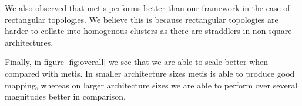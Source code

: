 We also observed that metis performs better than our framework in the case of
rectangular topologies. We believe this is because rectangular topologies are
harder to collate into homogenous clusters as there are straddlers in non-square
architectures.

Finally, in figure \ref{fig:overall} we see that we are able to scale better
when compared with metis. In smaller architecture sizes metis is able to
produce good mapping, whereas on larger architecture sizes we are able to
perform over several magnitudes better in comparison.





